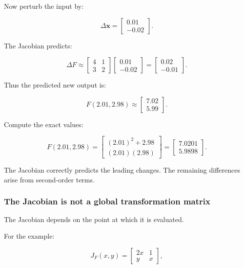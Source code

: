 Now perturb the input by:

\[
\Delta\mathbf x= \begin{bmatrix} 0.01\\-0.02 \end{bmatrix}.
\]

The Jacobian predicts:

\[
\Delta F\approx \begin{bmatrix} 4&1\\ 3&2 \end{bmatrix} \begin{bmatrix} 0.01\\-0.02 \end{bmatrix} = \begin{bmatrix} 0.02\\-0.01 \end{bmatrix}.
\]

Thus the predicted new output is:

\[
F(2.01,2.98)\approx \begin{bmatrix} 7.02\\5.99 \end{bmatrix}.
\]

Compute the exact values:

\[
F(2.01,2.98)= \begin{bmatrix} (2.01)^2+2.98\\ (2.01)(2.98) \end{bmatrix} = \begin{bmatrix} 7.0201\\ 5.9898 \end{bmatrix}.
\]

The Jacobian correctly predicts the leading changes. The remaining differences arise from second-order terms.

\subsubsection{The Jacobian is not a global transformation matrix}\label{02-foundations-ii-ch021-the-jacobian-is-not-a-global-transformation-matrix}

\hypertarget{02-foundations-ii-ch021-the-jacobian-is-not-a-global-transformation-matrix}{}

The Jacobian depends on the point at which it is evaluated.

For the example:

\[
J_F(x,y)= \begin{bmatrix}2x&1\\y&x\end{bmatrix},
\]

